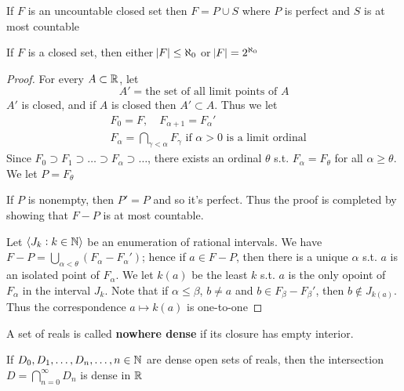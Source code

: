 \documentclass[11pt]{article}
\begin{document}
\begin{theorem}
If \(F\) is an uncountable closed set then \(F=P\cup S\) where \(P\) is perfect and
\(S\) is at most countable
\end{theorem}
\begin{corollary}[]
If \(F\) is a closed set, then either \(\abs{F}\le\aleph_0\) or
\(\abs{F}=2^{\aleph_0}\)
\end{corollary}
\begin{proof}
For every \(A\subset\mathbb{R}\), let
\begin{equation*}
A'=\text{the set of all limit points of } A
\end{equation*}
\(A'\) is closed, and if \(A\) is closed then \(A'\subset A\). Thus we let
\begin{align*}
&F_0=F,\quad F_{\alpha+1}=F_\alpha'\\
&F_\alpha=\displaystyle\bigcap_{\gamma<\alpha}F_\gamma\text{ if }\alpha>0
\text{ is a limit ordinal} 
\end{align*}
Since \(F_0\supset F_1\supset\dots\supset F_\alpha\supset\dots\), there exists
an ordinal \(\theta\) s.t. \(F_\alpha=F_\theta\) for all \(\alpha\ge\theta\). We let
\(P=F_\theta\) 

If \(P\) is nonempty, then \(P'=P\) and so it's perfect. Thus the proof is
completed by showing that \(F-P\) is at most countable.

Let \(\langle J_k:k\in\mathbb{N}\rangle\) be an enumeration of rational intervals. We have
\(F-P=\bigcup_{\alpha<\theta}(F_\alpha-F_\alpha')\); hence if \(a\in F-P\), then
there is a unique \(\alpha\) s.t. \(a\) is an isolated point of \(F_\alpha\). We let
\(k(a)\) be the least \(k\) s.t. \(a\) is the only opoint of \(F_\alpha\) in the
interval \(J_k\). Note that if \(\alpha\le\beta\), \(b\neq a\) and \(b\in
   F_\beta-F_\beta'\), then \(b\not\in J_{k(a)}\). Thus the correspondence
\(a\mapsto k(a)\) is one-to-one
\end{proof}
A set of reals is called \textbf{nowhere dense} if its closure has empty interior.

\begin{theorem}
If \(D_0,D_1,\dots,D_n,\dots,n\in\mathbb{N}\) are dense open sets of reals, then the
intersection \(D=\bigcap_{n=0}^\infty D_n\) is dense in \(\mathbb{R}\)
\end{theorem}
\end{document}
